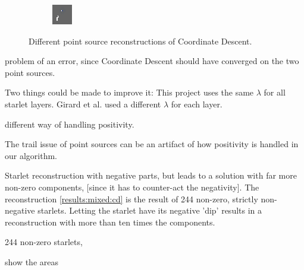 \begin{figure}[h]
\begin{subfigure}[b]{0.2\linewidth}
	\end{subfigure}
	\begin{subfigure}[b]{0.2\linewidth}
		\includegraphics[width=\linewidth]{./chapters/20.results/mixed/problems/point3.png}
	\end{subfigure}
	\caption{Different point source reconstructions of Coordinate Descent.}
	\label{results:mixed:points}
\end{figure}

problem of an error, since Coordinate Descent should have converged on the two point sources.

Two things could be made to improve it: This project uses the same $\lambda$ for all starlet layers. Girard et al.\cite{girard2015sparse} used a different $\lambda$ for each layer. 

different way of handling positivity. 

The trail issue of point sources can be an artifact of how positivity is handled in our algorithm. 

Starlet reconstruction with negative parts, but leads to a solution with far more non-zero components, [since it has to counter-act the negativity]. The reconstruction \ref{results:mixed:cd} is the result of 244 non-zero, strictly non-negative starlets. Letting the starlet have its negative 'dip' results in a reconstruction with more than ten times the components. 


244 non-zero starlets, 

show the areas

